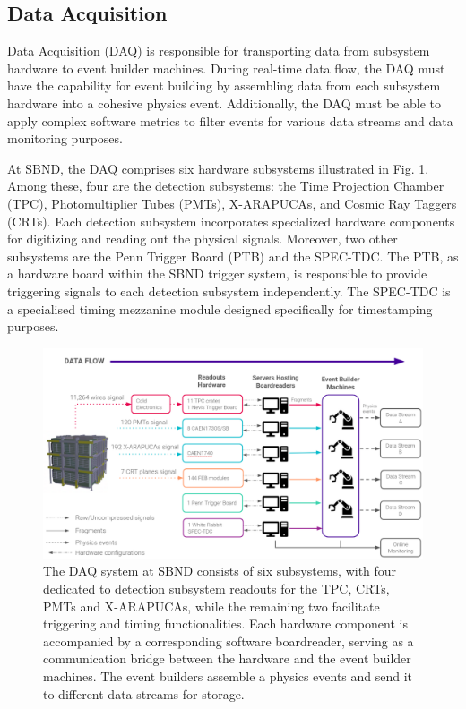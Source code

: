 \subsection{Data Acquisition}

\label{sec4Overview}

Data Acquisition (DAQ) is responsible for transporting data from subsystem hardware to event builder machines.
During real-time data flow, the DAQ must have the capability for event building by assembling data from each subsystem hardware into a cohesive physics event. 
Additionally, the DAQ must be able to apply complex software metrics to filter events for various data streams and data monitoring purposes.

At SBND, the DAQ comprises six hardware subsystems illustrated in Fig. \ref{fig:daqOverview}.
Among these, four are the detection subsystems: the Time Projection Chamber (TPC), Photomultiplier Tubes (PMTs), X-ARAPUCAs, and Cosmic Ray Taggers (CRTs).
Each detection subsystem incorporates specialized hardware components for digitizing and reading out the physical signals. 
Moreover, two other subsystems are the Penn Trigger Board (PTB) \cite{ptb_gvs} and the SPEC-TDC. 
The PTB, as a hardware board within the SBND trigger system, is responsible to provide triggering signals to each detection subsystem independently.
The SPEC-TDC is a specialised timing mezzanine module designed specifically for timestamping purposes.

\begin{figure}[htbp!] 
\centering    
\includegraphics[width=1.0\textwidth]{DAQ_Overview}
\caption[DAQOverview]{
The DAQ system at SBND consists of six subsystems, with four dedicated to detection subsystem readouts for the TPC, CRTs, PMTs and X-ARAPUCAs, while the remaining two facilitate triggering and timing functionalities.
Each hardware component is accompanied by a corresponding software boardreader, serving as a communication bridge between the hardware and the event builder machines.
The event builders assemble a physics events and send it to different data streams for storage.
}
\label{fig:daqOverview}
\end{figure}

